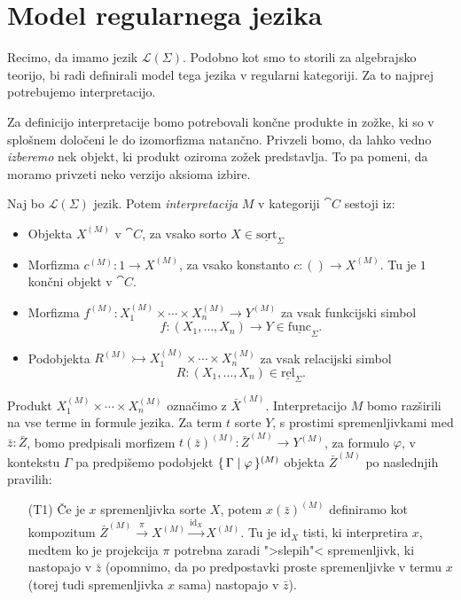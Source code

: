 \documentclass[../kategoricna_logika.tex]{subfiles}
\begin{document}
\section{Model regularnega jezika}
Recimo, da imamo jezik \(\mathcal{L}(\Sigma)\). Podobno kot smo to
storili za algebrajsko teorijo, bi radi definirali model tega jezika v
regularni kategoriji.  Za to najprej potrebujemo interpretacijo.
\begin{opomba}
  Za definicijo interpretacije bomo potrebovali končne produkte in
  zožke, ki so v splošnem določeni le do izomorfizma natančno.
  Privzeli bomo, da lahko vedno \emph{izberemo} nek objekt, ki
  produkt oziroma zožek predstavlja. To pa pomeni, da moramo
  privzeti neko verzijo aksioma izbire.
\end{opomba}
\begin{definicija}
  Naj bo $\mathcal{L}(\Sigma)$ jezik. Potem \emph{interpretacija} $M$
  v kategoriji $\cat{C}$ sestoji iz:
  \begin{itemize}
  \item Objekta $X^{(M)}$ v $\cat{C}$, za vsako sorto
    $X \in \underline{\mathrm{sort}}_\Sigma$
  \item Morfizma $c^{(M)} : 1 \to X^{(M)}$, za vsako konstanto
    $c : () \to X^{(M)}$. Tu je $1$ končni objekt
    v $\cat{C}$.
  \item Morfizma
    $f^{(M)} : X_1^{(M)} \times \cdots \times X_n^{(M)} \to Y^{(M)}$
    za vsak funkcijski simbol
    \[f : (X_1, \ldots, X_n) \to Y \in
      \underline{\mathrm{func}}_\Sigma.\]
  \item Podobjekta
    $R^{(M)} \rightarrowtail X_1^{(M)} \times \cdots \times X_n^{(M)}$
    za vsak relacijski simbol
    \[R : (X_1, \ldots, X_n) \in
      \underline{\mathrm{rel}}_\Sigma.\]
  \end{itemize}
  Produkt $X_1^{(M)} \times \cdots \times X_n^{(M)}$ označimo z
  $\bar{X}^{(M)}$.  Interpretacijo $M$ bomo razširili na vse terme in
  formule jezika.  Za term $t$ sorte $Y$, s prostimi spremenljivkami
  med $\bar{z} : \bar{Z}$, bomo predpisali morfizem
  $t(\bar{z})^{(M)} : \bar{Z}^{(M)} \to Y^{(M)}$, za formulo
  $\varphi$, v kontekstu $\Gamma$ pa predpišemo podobjekt  $\lbrace\,\Gamma \mid \varphi\,\rbrace^{(M)}$ objekta
  $\bar{Z}^{(M)}$ po naslednjih pravilih:
  \begin{itemize}
  \item[(T1)] Če je $x$ spremenljivka sorte $X$, potem
    $x(\bar{z})^{(M)}$ definiramo kot kompo\-zi\-tum
    $\bar{Z}^{(M)} \xrightarrow{\pi} X^{(M)}
    \xrightarrow{\mathrm{id}_X} X^{(M)}$.  Tu je $\mathrm{id}_X$
    tisti, ki interpretira $x$, medtem ko je projekcija $\pi$
    potrebna zaradi ">slepih"< spremenljivk, ki nastopajo v $\bar{z}$
    (opomnimo, da po predpostavki proste spremenljivke v termu $x$
    (torej tudi spremenljivka $x$ sama) nastopajo v $\bar{z}$).


\end{itemize}
\end{definicija}
\end{document}
